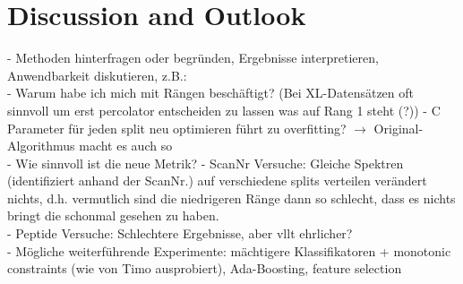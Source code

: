
\chapter{Discussion and Outlook}
\label{discussion}

- Methoden hinterfragen oder begründen, Ergebnisse interpretieren, Anwendbarkeit diskutieren, z.B.:\\
- Warum habe ich mich mit Rängen beschäftigt? (Bei XL-Datensätzen oft sinnvoll um erst percolator entscheiden zu lassen was auf Rang 1 steht (?))
- C Parameter für jeden split neu optimieren führt zu overfitting? $\rightarrow$ Original-Algorithmus macht es auch so\\
- Wie sinnvoll ist die neue Metrik?
- ScanNr Versuche: Gleiche Spektren (identifiziert anhand der ScanNr.) auf verschiedene splits verteilen verändert nichts, d.h. vermutlich sind die niedrigeren Ränge dann so schlecht, dass es nichts bringt die schonmal gesehen zu haben.\\
- Peptide Versuche: Schlechtere Ergebnisse, aber vllt ehrlicher?\\
- Mögliche weiterführende Experimente: mächtigere Klassifikatoren + monotonic constraints (wie von Timo ausprobiert), Ada-Boosting, feature selection
